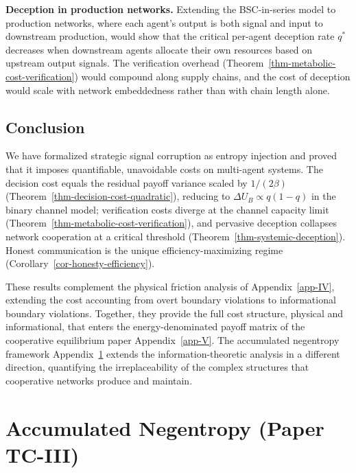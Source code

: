 \documentclass[11pt]{article}
\theoremstyle{plain}
\theoremstyle{definition}
\theoremstyle{remark}
\let\origsection\section
\renewcommand{\section}{\needspace{12\baselineskip}\origsection}
\let\origsubsection\subsection
\renewcommand{\subsection}{\needspace{7\baselineskip}\origsubsection}
\begin{document}
\textbf{Deception in production networks.} Extending the BSC-in-series
model to production networks, where each agent's output is both signal
and input to downstream production, would show that the critical
per-agent deception rate \(q^*\) decreases when downstream agents
allocate their own resources based on upstream output signals. The
verification overhead (Theorem~\ref{thm-metabolic-cost-verification})
would compound along supply chains, and the cost of deception would
scale with network embeddedness rather than with chain length alone.

\subsection{Conclusion}\label{conclusion-1}

We have formalized strategic signal corruption as entropy injection and
proved that it imposes quantifiable, unavoidable costs on multi-agent
systems. The decision cost equals the residual payoff variance scaled by
\(1/(2\beta)\) (Theorem~\ref{thm-decision-cost-quadratic}), reducing to
\(\Delta U_B \propto q(1-q)\) in the binary channel model; verification
costs diverge at the channel capacity limit
(Theorem~\ref{thm-metabolic-cost-verification}), and pervasive deception
collapses network cooperation at a critical threshold
(Theorem~\ref{thm-systemic-deception}). Honest communication is the
unique efficiency-maximizing regime
(Corollary~\ref{cor-honesty-efficiency}).

These results complement the physical friction analysis of
Appendix~\ref{app-IV}, extending the cost accounting from overt boundary
violations to informational boundary violations. Together, they provide
the full cost structure, physical and informational, that enters the
energy-denominated payoff matrix of the cooperative equilibrium paper
Appendix~\ref{app-V}. The accumulated negentropy framework
Appendix~\ref{app-III} extends the information-theoretic analysis in a
different direction, quantifying the irreplaceability of the complex
structures that cooperative networks produce and maintain.

\section{Accumulated Negentropy (Paper TC-III)}\label{app-III}
\end{document}
